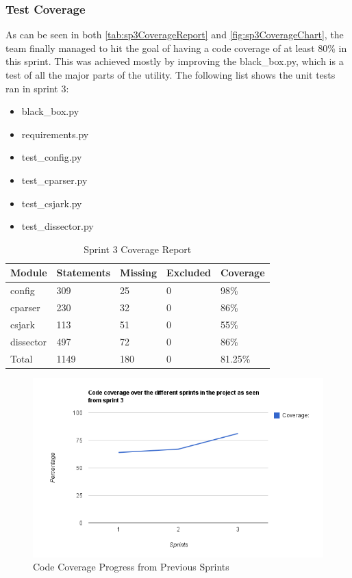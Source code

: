 \subsubsection{Test Coverage}
As can be seen in both \autoref{tab:sp3CoverageReport} and \autoref{fig:sp3CoverageChart}, the team finally managed to hit the goal of having a code coverage of at least 80\% in this sprint. This was achieved mostly by improving the black\_box.py, which is a test of all the major parts of the \gls{utility}. The following list shows the unit tests ran in sprint 3:

\begin{itemize}
	\item black\_box.py
	\item requirements.py
	\item test\_config.py
	\item test\_cparser.py
	\item test\_csjark.py
	\item test\_dissector.py
\end{itemize}

\begin{table}[!htb]\footnotesize\center
	\caption{Sprint 3 Coverage Report\label{tab:sp3CoverageReport}}
	\begin{tabular}{l l l l l}
		\toprule
		Module & Statements & Missing & Excluded & Coverage\\
		\midrule
		config & 309 & 25 & 0 & 98\%\ \\
		cparser & 230 & 32 & 0 & 86\%\ \\
		csjark & 113 & 51 & 0 & 55\%\ \\
		dissector & 497 & 72 & 0 & 86\%\ \\
		Total & 1149 & 180  & 0 & 81.25\%\ \\
		\bottomrule
	\end{tabular}
\end{table}

\begin{figure}[htb]
	\center
	\includegraphics[width=\textwidth]{./sprints/img/sprint3_code_coverage_chart.png}
	\caption{Code Coverage Progress from Previous Sprints\label{fig:sp3CoverageChart}}
\end{figure}

